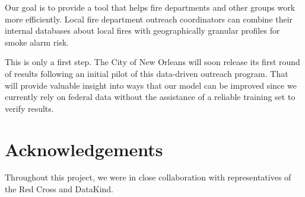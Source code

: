 \documentclass{sig-alternate}
\begin{document}
Our goal is to provide a tool that helps fire departments and other groups work more efficiently. Local fire department outreach coordinators can combine their internal databases about local fires with geographically granular profiles for smoke alarm risk. 

This is only a first step. The City of New Orleans will soon release its first round of results following an initial pilot of this data-driven outreach program. That will provide valuable insight into ways that our model can be improved since we currently rely on federal data without the assistance of a reliable training set to verify results. 

\section{Acknowledgements}
Throughout this project, we were in close collaboration with representatives of the Red Cross and DataKind.





\end{document}
